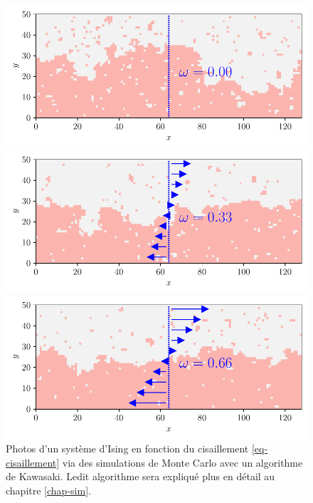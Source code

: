 \begin{figure}
	\begin{minipage}[t]{0.5\linewidth}
		\includegraphics[width=\linewidth]{intro/cis-ising-f-000.pdf}
	\end{minipage}%
	\begin{minipage}[t]{0.5\linewidth}
		\includegraphics[width=\linewidth]{intro/cis-ising-f-033.pdf}
	\end{minipage}
	\centering
	\begin{minipage}[t]{0.5\linewidth}
		\includegraphics[width=\linewidth]{intro/cis-ising-f-066.pdf}
	\end{minipage}
	\caption{Photos d'un système d'Ising en fonction du cisaillement  \ref{eq-cisaillement} via des simulations de Monte Carlo avec un algorithme de Kawasaki. Ledit algorithme sera expliqué plus en détail au chapitre \ref{chap-sim}.}
    \label{snap-ising-shear}	
\end{figure}  

